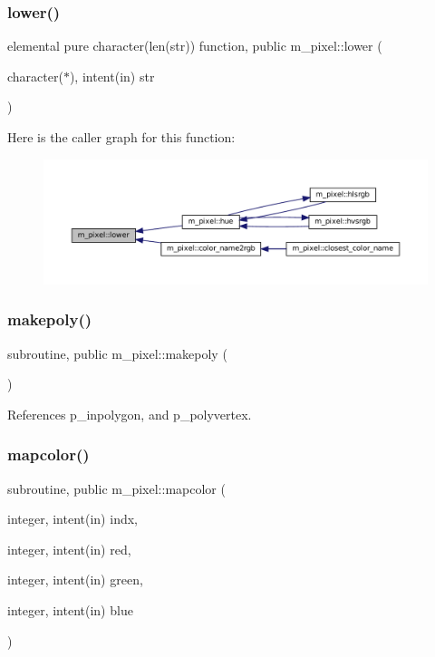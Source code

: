 \subsubsection{\texorpdfstring{lower()}{lower()}}
{\footnotesize\ttfamily elemental pure character(len(str)) function, public m\+\_\+pixel\+::lower (\begin{DoxyParamCaption}\item[{character($\ast$), intent(in)}]{str }\end{DoxyParamCaption})}

Here is the caller graph for this function\+:
\nopagebreak
\begin{figure}[H]
\begin{center}
\leavevmode
\includegraphics[width=350pt]{namespacem__pixel_a7b4934756a8325a19fee6653c4cbf6af_icgraph}
\end{center}
\end{figure}
\mbox{\label{namespacem__pixel_ab7128437f95b40004bf73fc6e3f597f8}} 
\subsubsection{\texorpdfstring{makepoly()}{makepoly()}}
{\footnotesize\ttfamily subroutine, public m\+\_\+pixel\+::makepoly (\begin{DoxyParamCaption}{ }\end{DoxyParamCaption})}



References p\+\_\+inpolygon, and p\+\_\+polyvertex.

\mbox{\label{namespacem__pixel_a3422f51171f30979868a8075690da9f5}} 
\subsubsection{\texorpdfstring{mapcolor()}{mapcolor()}}
{\footnotesize\ttfamily subroutine, public m\+\_\+pixel\+::mapcolor (\begin{DoxyParamCaption}\item[{integer, intent(in)}]{indx,  }\item[{integer, intent(in)}]{red,  }\item[{integer, intent(in)}]{green,  }\item[{integer, intent(in)}]{blue }\end{DoxyParamCaption})}



